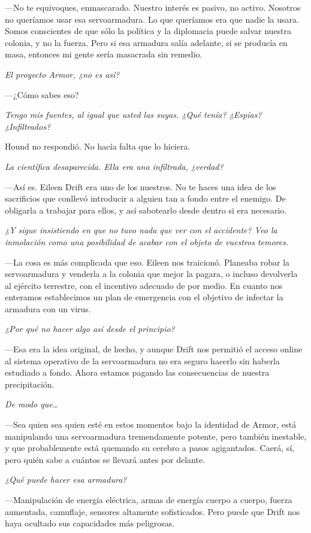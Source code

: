 ---No te equivoques, enmascarado. Nuestro interés es pasivo, no activo. Nosotros no queríamos usar esa servoarmadura. Lo que queríamos era que nadie la usara. Somos conscientes de que sólo la política y la diplomacia puede salvar nuestra colonia, y no la fuerza. Pero si esa armadura salía adelante, si se producía en masa, entonces mi gente sería masacrada sin remedio.

\emph{El proyecto Armor, ¿no es así?}

---¿Cómo sabes eso?

\emph{Tengo mis fuentes, al igual que usted las suyas. ¿Qué tenía? ¿Espías? ¿Infiltrados?}

Hound no respondió. No hacía falta que lo hiciera.

\emph{La científica desaparecida. Ella era una infiltrada, ¿verdad?}

---Así es. Eileen Drift era uno de los nuestros. No te haces una idea de los sacrificios que conllevó introducir a alguien tan a fondo entre el enemigo. De obligarla a trabajar para ellos, y así sabotearlo desde dentro si era necesario.

\emph{¿Y sigue insistiendo en que no tuvo nada que ver con el accidente? Veo la inmolación como una posibilidad de acabar con el objeto de vuestros temores.}

---La cosa es más complicada que eso. Eileen nos traicionó. Planeaba robar la servoarmadura y venderla a la colonia que mejor la pagara, o incluso devolverla al ejército terrestre, con el incentivo adecuado de por medio. En cuanto nos enteramos establecimos un plan de emergencia con el objetivo de infectar la armadura con un virus.

\emph{¿Por qué no hacer algo así desde el principio?}

---Esa era la idea original, de hecho, y aunque Drift nos permitió el acceso online al sistema operativo de la servoarmadura no era seguro hacerlo sin haberla estudiado a fondo. Ahora estamos pagando las consecuencias de nuestra precipitación.

\emph{De modo que\dots}

---Sea quien sea quien esté en estos momentos bajo la identidad de Armor, está manipulando una servoarmadura tremendamente potente, pero también inestable, y que probablemente está quemando su cerebro a pasos agigantados. Caerá, sí, pero quién sabe a cuántos se llevará antes por delante.

\emph{¿Qué puede hacer esa armadura?}

---Manipulación de energía eléctrica, armas de energía cuerpo a cuerpo, fuerza aumentada, camuflaje, sensores altamente sofisticados. Pero puede que Drift nos haya ocultado sus capacidades más peligrosas.

